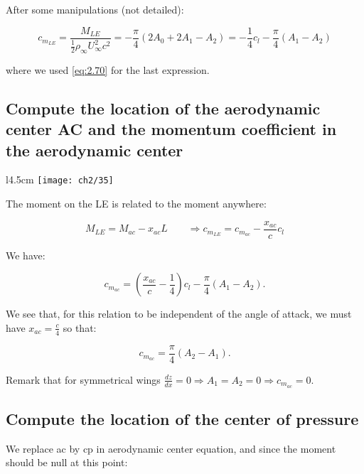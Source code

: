 \documentclass[british,french,11pt, a4paper, openany]{article}
\begin{document}
After some manipulations (not detailed):

\begin{equation}
c_{m_{LE}} = \frac{M_{LE}}{\frac{1}{2}\rho _\infty U_\infty ^2 c^2} = - \frac{\pi}{4} (2A_0 + 2A_1 - A_2) = -\frac{1}{4} c_l - \frac{\pi}{4} (A_1 - A_2)
\end{equation}

where we used \eqref{eq:2.70} for the last expression.

\subsection{Compute the location of the aerodynamic center AC and the momentum coefficient in the aerodynamic center}

\begin{wrapfigure}[6]{l}{4.5cm}
	\vspace{-5mm}
	\texttt{[image: ch2/35]}
\end{wrapfigure}
The moment on the LE is related to the moment anywhere:

\begin{equation}
M_{LE} = M_{ac} - x_{ac} L \qquad \Rightarrow c_{m_{LE}} =c_{m_{ac}} - \frac{x_{ac}}{c}c_{l} 
\end{equation}

We have: 

\begin{equation}
c_{m_{ac}} = \left( \frac{x_{ac}}{c} - \frac{1}{4} \right) c_l - \frac{\pi}{4} (A_1 -A_2).
\end{equation}

We see that, for this relation to be independent of the angle of attack, we must have $x_{ac} = \frac{c}{4}$ so that: 

\begin{equation}
c_{m_{ac}} = \frac{\pi}{4} (A_2 - A_1).
\label{eq:2.77}
\end{equation}

Remark that for symmetrical wings $\frac{dz}{dx} = 0 \Rightarrow A_1 = A_2 = 0 \Rightarrow c_{m_{ac}} = 0$. 

\subsection{Compute the location of the center of pressure}

We replace ac by cp in aerodynamic center equation, and since the moment should be null at this point:
\end{document}
